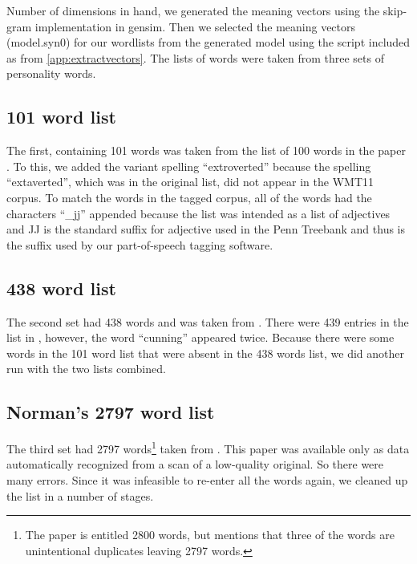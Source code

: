 \documentclass[eric_thesis.tex]{subfiles}
\begin{document}
Number of dimensions in hand, we generated the meaning vectors using the 
skip-gram implementation in gensim.  Then we selected the 
meaning vectors (model.syn0) for our wordlists from the generated model using 
the script included as  from 
\ref{app:extractvectors}. The lists of words were taken from three sets of 
personality words. 

\subsection{101 word list}

The first, containing 
101 words was taken from the list of 100 words in the paper . To this, we added the variant spelling 
``extroverted'' because the spelling ``extaverted'', which was in the original 
list, did not appear in the WMT11 corpus. To match the words in the tagged
corpus, all of the words had the characters ``\_jj'' appended because the list
was intended as a list of adjectives and JJ is the standard suffix for adjective
used in the Penn Treebank  and thus is the suffix
used by our part-of-speech tagging software.

\subsection{438 word list}

The second set had 438 words and was 
taken from . There were 439 
entries in the list in , however, the word ``cunning'' 
appeared twice. Because there were some words in the 101 word list that were 
absent in the 438 words list, we did another run with the two lists combined.

\subsection{Norman's 2797 word list}

The third set had 2797 words\footnote{The paper is entitled 2800 words, but 
mentions
that three of the words are unintentional duplicates leaving 2797 words.}
taken from . This paper
was available only as data automatically recognized from a scan of a low-quality
original. So there were many errors. Since it was infeasible to re-enter all the
words again, we cleaned up the list in a number of stages. 
\end{document}
